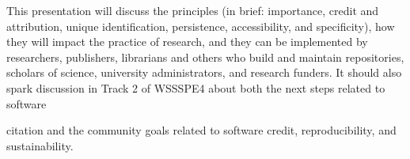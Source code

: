 \documentclass[conference]{IEEEtran}
\begin{document}
{
This presentation will discuss the principles (in brief: importance, credit and attribution, unique identification, persistence, accessibility, and specificity), how they will impact the practice of research, and they can be implemented by researchers, publishers, librarians and others who build and maintain repositories, scholars of science, university administrators, and research funders. It should also spark discussion in Track 2 of WSSSPE4 about both the next steps related to software
\unskip\parfillskip 0pt \par }

\vfill \break

\noindent citation and the community goals related to software credit, reproducibility, and sustainability.

%
%

\end{document}
